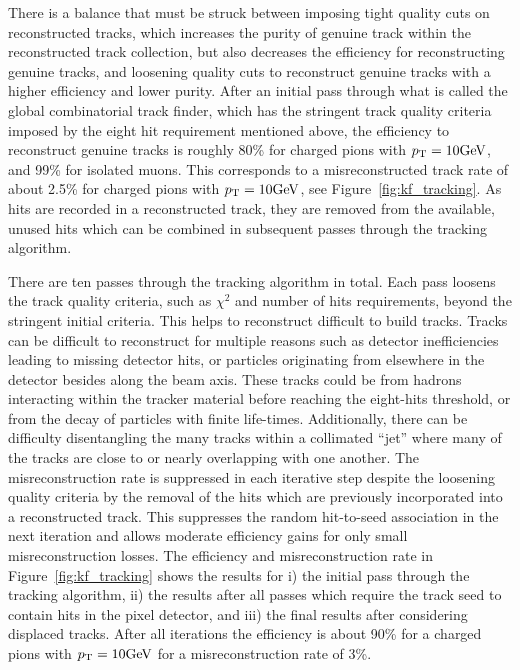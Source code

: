 There is a balance that must be struck between imposing tight quality cuts on reconstructed
tracks, which increases the purity of genuine track within the reconstructed track collection,
but also decreases the efficiency for reconstructing genuine tracks, and loosening
quality cuts to reconstruct genuine tracks with a higher efficiency and lower purity.
After an initial pass through what is called the global combinatorial track finder,
which has the stringent track quality criteria imposed by the eight hit requirement
mentioned above, the efficiency to reconstruct
genuine tracks is roughly 80\% for charged pions with $p_\mathrm{T} = 10\mathrm{GeV}$, and 99\%
for isolated muons. This corresponds to a misreconstructed track rate of
about 2.5\% for charged pions with $p_\mathrm{T} = 10\mathrm{GeV}$, see Figure~\ref{fig:kf_tracking}.
As hits are recorded in a reconstructed track, they are removed from the available,
unused hits which can be combined in subsequent passes through the tracking algorithm.

There are ten passes through the tracking algorithm in total. Each pass loosens the track quality criteria,
such as $\chi^2$ and number of hits requirements, beyond the stringent initial criteria.
This helps to reconstruct difficult to build tracks. Tracks can be difficult to 
reconstruct for multiple reasons such as detector inefficiencies leading to missing
detector hits, or particles originating from elsewhere in the detector 
besides along the beam axis. These tracks could be from hadrons interacting
within the tracker material before reaching the eight-hits threshold, or from the decay
of particles with finite life-times. Additionally, there can be difficulty disentangling
the many tracks within a collimated ``jet'' where many of the tracks are close to or
nearly overlapping with one another.
The misreconstruction rate is suppressed in each iterative step despite the loosening
quality criteria by the removal of the hits which are previously incorporated into
a reconstructed track. This  suppresses the random hit-to-seed association in the
next iteration and allows moderate efficiency gains for only small misreconstruction losses.
The efficiency and misreconstruction rate in Figure~\ref{fig:kf_tracking} shows the
results for i) the initial pass through the tracking algorithm, ii) the results after all
passes which require the track seed to contain hits in the pixel detector, and iii) the
final results after considering displaced tracks.
After all iterations the efficiency is about 90\% for a charged pions with $p_\mathrm{T} = 10\mathrm{GeV}$
for a misreconstruction rate of 3\%.

